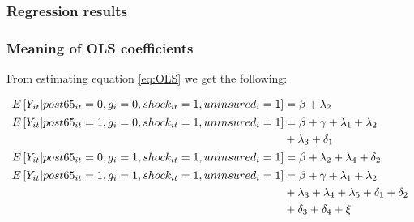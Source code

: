 \documentclass[10pt,compress,xcolor=dvipsnames]{beamer}    %
\newcounter{ex}
\newcommand{\1}[1]{\mathrm{1\hspace*{-2.5pt}l}[#1]}	%
\begin{document}
\begin{frame}
\frametitle{Regression results} \label{frame:fullreg}

\begin{table}[ht]
	\resizebox{0.9\textheight}{!}{
		
	}
\end{table}

\hyperlink{fig:maincoeffplot}{}

\end{frame}

\begin{frame}
\frametitle{Meaning of OLS coefficients} \label{frame:OLSmath}
From estimating equation \ref{eq:OLS} we get the following:
\hyperlink{fig:maincoeffplot}{}

\begin{footnotesize}
\begin{align}
\phantom{E\left[ Y_{it}| post65_{it}=1, g_i=1, shock_{it}=1,uninsured_i=1\right]}
&\begin{aligned}
	\mathllap{E\left[ Y_{it}| post65_{it}=0, g_i=0, shock_{it}=1,uninsured_i=1\right]} &=\beta+\lambda_2
\end{aligned}\\
&\begin{aligned}
	\mathllap{E\left[ Y_{it}| post65_{it}=1, g_i=0, shock_{it}=1,uninsured_i=1\right]} &=\beta+\gamma+\lambda_1+\lambda_2\\ &+\lambda_3+\delta_1
\end{aligned}\\
&\begin{aligned}
	\mathllap{E\left[ Y_{it}| post65_{it}=0, g_i=1, shock_{it}=1,uninsured_i=1\right]} &=\beta+\lambda_2+\lambda_4+\delta_2
\end{aligned}\\
&\begin{aligned}
	\mathllap{E\left[ Y_{it}| post65_{it}=1, g_i=1, shock_{it}=1,uninsured_i=1\right]} &=\beta+\gamma+\lambda_1+\lambda_2\\
	&+\lambda_3+\lambda_4+\lambda_5+\delta_1+\delta_2\\
	&+\delta_3+\delta_4+\xi
\end{aligned}
\end{align}


\end{footnotesize}
\end{frame}
\end{document}
